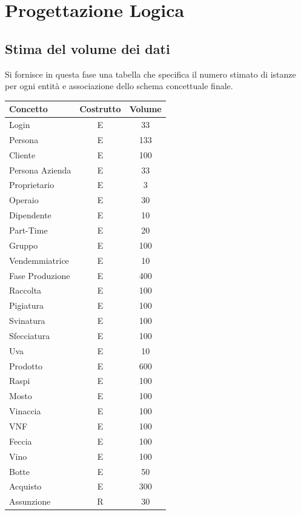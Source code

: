 \documentclass{article}
\begin{document}
\section{Progettazione Logica}
\subsection{Stima del volume dei dati}
Si fornisce in questa fase una tabella che specifica il numero stimato di istanze per ogni entità e associazione dello schema concettuale finale.\
\newline
\newline
\begin{tabular}{p{} c c}\hline
    \textbf{Concetto} & \textbf{Costrutto}   & \textbf{Volume } \\\hline
    Login& E & 33\\\hline
    Persona &E& 133\\\hline
    Cliente & E & 100\\\hline
    Persona Azienda &E&33\\\hline
    Proprietario& E & 3\\\hline
    Operaio& E & 30\\\hline
    Dipendente& E & 10  \\\hline
    Part-Time& E & 20 \\\hline
    Gruppo& E & 100\\\hline
    Vendemmiatrice& E & 10\\\hline
    Fase Produzione & E & 400\\\hline
    Raccolta & E & 100\\\hline
    Pigiatura & E & 100\\\hline
    Svinatura & E &  100\\\hline
    Sfecciatura & E & 100 \\\hline
    Uva & E & 10\\\hline
    Prodotto & E & 600\\\hline
    Raspi & E & 100\\\hline
    Mosto& E & 100\\\hline
     Vinaccia& E &100 \\\hline
    VNF& E & 100\\\hline
    Feccia& E & 100\\\hline
    Vino & E & 100\\\hline
    Botte & E & 50\\\hline
    Acquisto & E & 300\\\hline
    Assunzione & R & 30\\\hline

\end{tabular}
\end{document}
